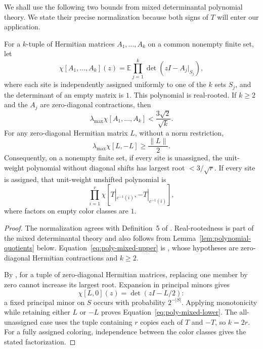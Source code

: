 We shall use the following two bounds from mixed determinantal polynomial
theory.  We state their precise normalization because both signs of \(T\)
will enter our application.

\begin{lemma}\label{lem:mixed-bounds}
For a \(k\)-tuple of Hermitian matrices \(A_1,\ldots,A_k\) on a common
nonempty finite set, let
\[
 \chi[A_1,\ldots,A_k](z)
 =\mathbb E\prod_{j=1}^k\det(zI-A_j|_{S_j}),
\]
where each site is independently assigned uniformly to one of the \(k\)
sets \(S_j\), and the determinant of an empty matrix is \(1\).
This polynomial is real-rooted.  If \(k\geq2\) and the \(A_j\) are
zero-diagonal contractions, then
\begin{equation}
             \lambda_{\max}\chi[A_1,\ldots,A_k]
                        <\frac{3\sqrt2}{\sqrt{k}}.
 \label{eq:poly-mixed-upper}
\end{equation}
For any zero-diagonal Hermitian matrix \(L\), without a norm restriction,
\begin{equation}
                \lambda_{\max}\chi[L,-L]\geq\frac{\|L\|}{2}.
 \label{eq:poly-mixed-lower}
\end{equation}
Consequently, on a nonempty finite set, if every site is unassigned, the unit-weight polynomial
without diagonal shifts has largest root \(<3/\sqrt r\).  If every site
is assigned, that unit-weight unshifted polynomial is
\[
                   \prod_{i=1}^r\chi[T|_{c^{-1}(i)},-T|_{c^{-1}(i)}],
\]
where factors on empty color classes are \(1\).
\end{lemma}

\begin{proof}
The normalization agrees with Definition~5 of \cite{RS17}.
Real-rootedness is part of the mixed determinantal theory and also follows
from Lemma~\ref{lem:polynomial-quotients} below.
Equation~\eqref{eq:poly-mixed-upper} is
\cite[Theorem~25]{RS17}, whose hypotheses are zero-diagonal Hermitian
contractions and \(k\geq2\).

By \cite[Proposition~16 and Theorem~15]{RS17}, for a tuple of
zero-diagonal Hermitian matrices, replacing one member by zero cannot
increase its largest root.
Expansion in principal minors gives
\[
                    \chi[L,0](z)=\det(zI-L/2):
\]
a fixed principal minor on \(S\) occurs with probability \(2^{-|S|}\).
Applying monotonicity while retaining either \(L\) or \(-L\) proves
Equation~\eqref{eq:poly-mixed-lower}.  The all-unassigned case uses the
tuple containing \(r\) copies each of \(T\) and \(-T\), so \(k=2r\).
For a fully assigned coloring, independence between the color classes
gives the stated factorization.
\end{proof}

